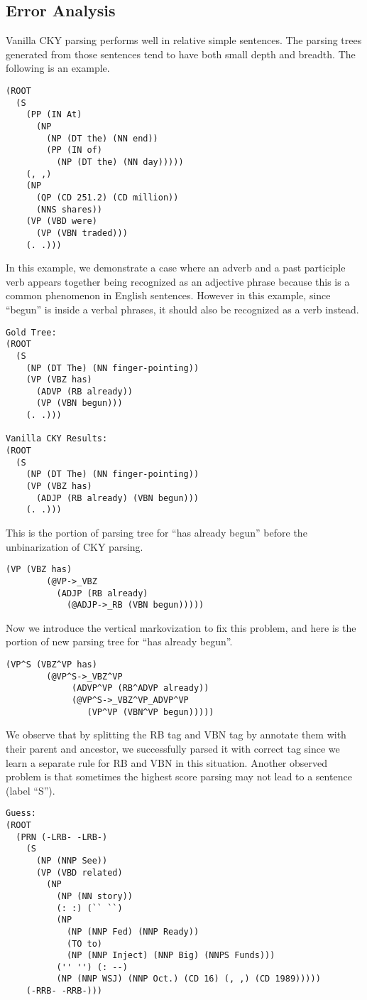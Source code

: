 \documentclass[letterpaper]{article}
\begin{document}
\subsection{Error Analysis}
Vanilla CKY parsing performs well in relative simple sentences. The parsing trees generated from those sentences tend to have both small depth and breadth. The following is an example.
\begin{verbatim} 
(ROOT
  (S
    (PP (IN At)
      (NP
        (NP (DT the) (NN end))
        (PP (IN of)
          (NP (DT the) (NN day)))))
    (, ,)
    (NP
      (QP (CD 251.2) (CD million))
      (NNS shares))
    (VP (VBD were)
      (VP (VBN traded)))
    (. .)))
\end{verbatim}

In this example, we demonstrate a case where an adverb and a past participle verb appears together being recognized as an adjective phrase because this is a common phenomenon in English sentences. However in this example, since “begun” is inside a verbal phrases, it should also be recognized as a verb instead.
\begin{verbatim}
Gold Tree:
(ROOT
  (S
    (NP (DT The) (NN finger-pointing))
    (VP (VBZ has)
      (ADVP (RB already))
      (VP (VBN begun)))
    (. .)))
    
Vanilla CKY Results:
(ROOT
  (S
    (NP (DT The) (NN finger-pointing))
    (VP (VBZ has)
      (ADJP (RB already) (VBN begun)))
    (. .)))
\end{verbatim}

This is the portion of parsing tree for ``has already begun'' before the unbinarization of CKY parsing.
\begin{verbatim}
(VP (VBZ has)
        (@VP->_VBZ
          (ADJP (RB already)
            (@ADJP->_RB (VBN begun)))))
\end{verbatim}
Now we introduce the vertical markovization to fix this problem, and here is the portion of new parsing tree for ``has already begun''.
\begin{verbatim}
(VP^S (VBZ^VP has)
        (@VP^S->_VBZ^VP
         	 (ADVP^VP (RB^ADVP already))
          	 (@VP^S->_VBZ^VP_ADVP^VP
            	(VP^VP (VBN^VP begun)))))
\end{verbatim}
We observe that by splitting the RB tag and VBN tag by annotate them with their parent and ancestor, we successfully parsed it with correct tag since we learn a separate rule for RB and VBN in this situation.
Another observed problem is that sometimes the highest score parsing may not lead to a sentence
(label ``S'').
\begin{verbatim}
Guess:
(ROOT
  (PRN (-LRB- -LRB-)
    (S
      (NP (NNP See))
      (VP (VBD related)
        (NP
          (NP (NN story))
          (: :) (`` ``)
          (NP
            (NP (NNP Fed) (NNP Ready))
            (TO to)
            (NP (NNP Inject) (NNP Big) (NNPS Funds)))
          ('' '') (: --)
          (NP (NNP WSJ) (NNP Oct.) (CD 16) (, ,) (CD 1989)))))
    (-RRB- -RRB-)))
\end{verbatim}
\end{document}
